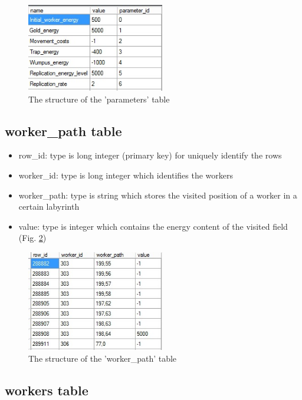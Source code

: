 \documentclass[a4paper,12pt]{article}
\begin{document}
\begin{figure}
	\begin{center}
		\includegraphics[width=6cm]{tabparameters.jpg}
		\caption{The structure of the 'parameters' table}
		\label{fig:tabparameters}
	\end{center}
\end{figure}

\subsection{worker\_path table}

\begin{itemize}
	\item row\_id: type is long integer (primary key) for uniquely identify the rows
	\item worker\_id: type is long integer which identifies the workers
	\item worker\_path: type is string which stores the visited position of a worker in a certain labyrinth
	\item value: type is integer which contains the energy content of the visited field (Fig. \ref{fig:tabworkerpath})
\end{itemize}

\begin{figure}
	\begin{center}
		\includegraphics[width=6cm]{tabworkerpath.jpg}
		\caption{The structure of the 'worker\_path' table}
		\label{fig:tabworkerpath}
	\end{center}
\end{figure}

\subsection{workers table}
\end{document}
